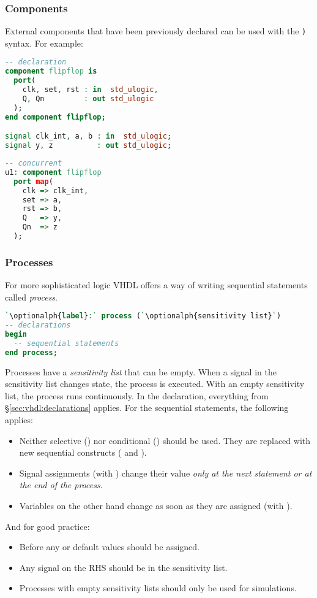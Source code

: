 \subsubsection{Components} \label{sec:vhdl:components}
External components that have been previously declared can be used with the
\texttt{)} syntax. For example:
\begin{lstlisting}[language=vhdl]
-- declaration
component flipflop is
  port(
    clk, set, rst : in  std_ulogic,
    Q, Qn         : out std_ulogic 
  );
end component flipflop;

signal clk_int, a, b : in  std_ulogic;
signal y, z          : out std_ulogic;
\end{lstlisting}
\begin{lstlisting}[language=vhdl]
-- concurrent
u1: component flipflop
  port map(
    clk => clk_int,
    set => a,
    rst => b,
    Q   => y,
    Qn  => z
  );

\end{lstlisting}

\subsubsection{Processes}
For more sophisticated logic VHDL offers a way of writing sequential statements
called \emph{process}.
\begin{lstlisting}[language=vhdl]
`\optionalph{label}:` process (`\optionalph{sensitivity list}`)
-- declarations
begin
  -- sequential statements
end process;
\end{lstlisting}
Processes have a \emph{sensitivity list} that can be empty.  When a signal in
the sensitivity list changes state, the process is executed.  With an empty
sensitivity list, the process runs continuously.  In the declaration,
everything from \S\ref{sec:vhdl:declarations} applies. For the sequential
statements, the following applies:
\begin{itemize}
  \item Neither selective () nor conditional () should be used.
    They are replaced with new sequential constructs ( and ).
  \item Signal assignments (with \vhdl{<=}) change their value
    \emph{only at the next}  \emph{statement or at the end of the process}.
  \item Variables on the other hand change as soon as they are assigned (with \vhdl{:=}).
\end{itemize}
And for good practice:
\begin{itemize}
  \item Before any  or  default values should be assigned.
  \item Any signal on the RHS should be in the sensitivity list.
  \item Processes with empty sensitivity lists should only be used for simulations.
\end{itemize}

